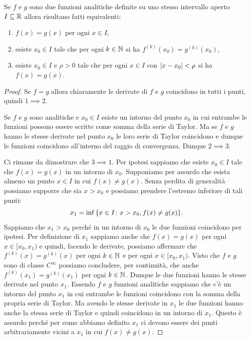 \begin{theorem}
Se $f$ e $g$ sono due funzioni analitiche definite su uno stesso intervallo
aperto $I\subseteq \mathbb R$ allora risultano fatti equivalenti:
\begin{enumerate}
 \item $f(x)=g(x)$ per ogni $x\in I$,
 \item esiste $x_0\in I$ tale che per ogni $k\in \mathbb N$ si ha $f^{(k)}(x_0) = g^{(k)}(x_0)$,
 \item esiste $x_0\in I$ e $\rho>0$ tale che per ogni $x\in I$ con ${\left|x-x_0\right|}<\rho$ si ha
 $f(x)=g(x)$.
\end{enumerate}
\end{theorem}
\begin{proof}
Se $f=g$ allora chiaramente le derivate di $f$ e $g$ coincidono in tutti i punti,
quindi $1\implies 2$.

Se $f$ e $g$ sono analitiche e $x_0\in I$ esiste un intorno del punto
$x_0$ in cui entrambe le funzioni possono essere scritte come
somma della serie di Taylor. Ma se $f$ e $g$ hanno le stesse derivate
nel punto $x_0$ le loro serie di Taylor coincidono e dunque le funzioni
coincidono all'interno del raggio di convergenza. Dunque $2\implies 3$.

Ci rimane da dimostrare che $3 \implies 1$.
Per ipotesi sappiamo che esiste $x_0\in I$ tale che $f(x) = g(x)$ in un intorno
di $x_0$. Supponiamo per assurdo che esista almeno un punto $x\in I$ in cui
$f(x) \neq g(x)$. Senza perdita di generalità possiamo supporre che sia
$x>x_0$ e possiamo prendere l'estremo inferiore di tali punti:
\[
  x_1 = \inf{\left\{ x\in I\colon x>x_0, f(x)\neq g(x) \right\}}.
\]
Sappiamo che $x_1>x_0$ perché in un intorno di $x_0$ le due funzioni
coincidono per ipotesi. Per definizione di $x_1$ sappiamo anche
che $f(x)=g(x)$ per ogni $x\in [x_0,x_1)$ e quindi, facendo le derivate,
possiamo affermare che $f^{(k)}(x) = g^{(k)}(x)$ per ogni $k\in \mathbb N$
e per ogni $x\in [x_0,x_1)$. Visto che $f$ e $g$ sono di classe $C^\infty$
possiamo concludere, per continuità, che anche $f^{(k)}(x_1)=g^{(k)}(x_1)$
per ogni $k\in \mathbb N$. Dunque le due funzioni hanno le stesse derivate
nel punto $x_1$. Essendo $f$ e $g$ funzioni analitiche sappiamo
che c'è un intorno del punto $x_1$ in cui entrambe le funzioni
coincidono con la somma della propria serie di Taylor. Ma avendo le
stesse derivate in $x_1$ le due funzioni hanno anche la stessa serie
di Taylor e quindi coincidono in un intorno di $x_1$. Questo
è assurdo perché per come abbiamo definito $x_1$ ci devono
essere dei punti arbitrariamente vicini a $x_1$ in cui $f(x)\neq g(x)$.
\end{proof}


